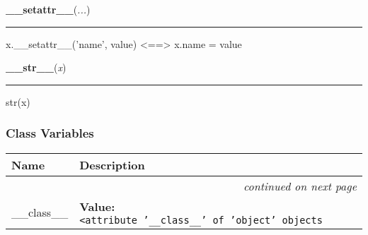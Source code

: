     \vspace{0.5ex}

    \begin{boxedminipage}{\textwidth}

    \raggedright \textbf{\_\_setattr\_\_}(\textit{...})

    \vspace{-1.5ex}

    \rule{\textwidth}{0.5\fboxrule}
    x.\_\_setattr\_\_('name', value) {\textless}=={\textgreater} x.name = 
    value

    \vspace{1ex}

    \end{boxedminipage}

    \label{object:__str__}

    \vspace{0.5ex}

    \begin{boxedminipage}{\textwidth}

    \raggedright \textbf{\_\_str\_\_}(\textit{x})

    \vspace{-1.5ex}

    \rule{\textwidth}{0.5\fboxrule}
    str(x)

    \vspace{1ex}

    \end{boxedminipage}



  \subsubsection{Class Variables}

\begin{longtable}{|p{}|p{}|l}
\cline{1-2}
\cline{1-2} \centering \textbf{Name} & \centering \textbf{Description}& \\
\cline{1-2}
\endhead\cline{1-2}\multicolumn{3}{r}{\small\textit{continued on next page}}\\\endfoot\cline{1-2}
\endlastfoot\raggedright \_\-\_\-c\-l\-a\-s\-s\-\_\-\_\- & \textbf{Value:} 
{\tt {\textless}\-a\-t\-t\-r\-i\-b\-u\-t\-e\-~\-'\-\_\-\_\-c\-l\-a\-s\-s\-\_\-\_\-'\-~\-o\-f\-~\-'\-o\-b\-j\-e\-c\-t\-'\-~\-o\-b\-j\-e\-c\-t\-s\-{\textgreater}\-}&\\
\cline{1-2}
\end{longtable}

